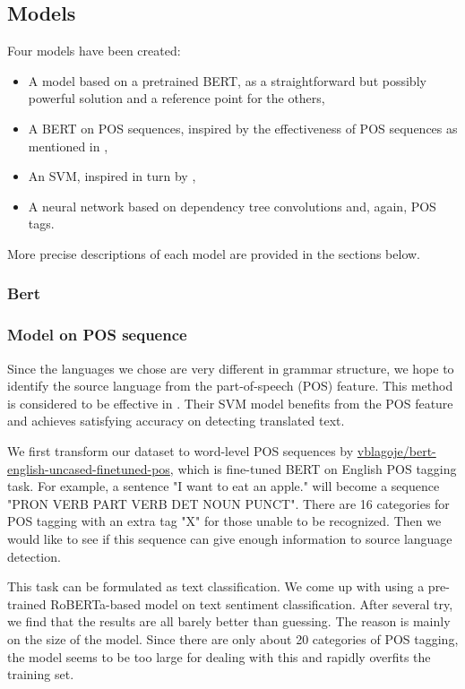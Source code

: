 \documentclass[twocolumn]{article}
\begin{document}
\subsection*{Models}

Four models have been created:

\begin{itemize}
	\item A model based on a pretrained BERT, as a straightforward but possibly powerful solution and a reference point for the others,
	\item A BERT on POS sequences, inspired by the effectiveness of POS sequences as mentioned in \cite{canada},
	\item An SVM, inspired in turn by \cite{literary},
	\item A neural network based on dependency tree convolutions and, again, POS tags.
\end{itemize}

More precise descriptions of each model are provided in the sections below.

\subsubsection*{Bert}

\subsubsection*{Model on POS sequence}
Since the languages we chose are very different in grammar structure, we hope to identify the source language from the part-of-speech (POS) feature. This method is considered to be effective in \cite{canada}. Their SVM model benefits from the POS feature and achieves satisfying accuracy on detecting translated text.

We first transform our dataset to word-level POS sequences by \href{https://huggingface.co/vblagoje/bert-english-uncased-finetuned-pos}{vblagoje/bert-english-uncased-finetuned-pos}, which is fine-tuned BERT on English POS tagging task. For example, a sentence "I want to eat an apple." will become a sequence "PRON VERB PART VERB DET NOUN PUNCT". There are 16 categories for POS tagging with an extra tag "X" for those unable to be recognized. Then we would like to see if this sequence can give enough information to source language detection.

This task can be formulated as text classification. We come up with using a pre-trained RoBERTa-based model on text sentiment classification. After several try, we find that the results are all barely better than guessing. The reason is mainly on the size of the model. Since there are only about 20 categories of POS tagging, the model seems to be too large for dealing with this and rapidly overfits the training set.
\end{document}
